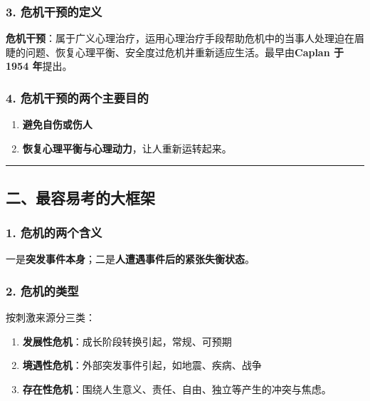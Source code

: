\documentclass[
  a4paper,
]{ctexart}
\providecommand{\tightlist}{%
  \setlength{\itemsep}{0pt}\setlength{\parskip}{0pt}}
\begin{document}
\subsubsection{3.
危机干预的定义}\label{ux5371ux673aux5e72ux9884ux7684ux5b9aux4e49}

\textbf{危机干预}：属于广义心理治疗，运用心理治疗手段帮助危机中的当事人处理迫在眉睫的问题、恢复心理平衡、安全度过危机并重新适应生活。最早由\textbf{Caplan
于 1954 年}提出。

\subsubsection{4.
危机干预的两个主要目的}\label{ux5371ux673aux5e72ux9884ux7684ux4e24ux4e2aux4e3bux8981ux76eeux7684}

\begin{enumerate}
\def\labelenumi{\arabic{enumi}.}
\tightlist
\item
  \textbf{避免自伤或伤人}
\item
  \textbf{恢复心理平衡与心理动力}，让人重新运转起来。
\end{enumerate}

\begin{center}\rule{0.5\linewidth}{0.5pt}\end{center}

\subsection{二、最容易考的大框架}\label{ux4e8cux6700ux5bb9ux6613ux8003ux7684ux5927ux6846ux67b6}

\subsubsection{1.
危机的两个含义}\label{ux5371ux673aux7684ux4e24ux4e2aux542bux4e49}

一是\textbf{突发事件本身}；二是\textbf{人遭遇事件后的紧张失衡状态}。

\subsubsection{2. 危机的类型}\label{ux5371ux673aux7684ux7c7bux578b}

按刺激来源分三类：

\begin{enumerate}
\def\labelenumi{\arabic{enumi}.}
\tightlist
\item
  \textbf{发展性危机}：成长阶段转换引起，常规、可预期
\item
  \textbf{境遇性危机}：外部突发事件引起，如地震、疾病、战争
\item
  \textbf{存在性危机}：围绕人生意义、责任、自由、独立等产生的冲突与焦虑。
\end{enumerate}
\end{document}
